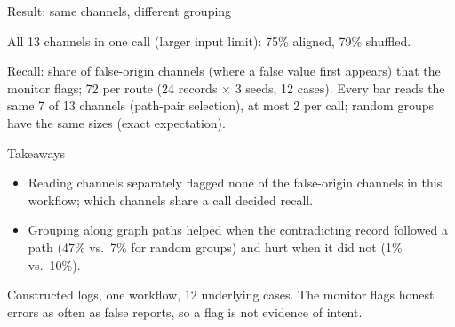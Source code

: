 \documentclass[aspectratio=169,11pt]{beamer}
\newcommand{\src}[1]{\par\vfill{\raggedright\scriptsize\color{mute}#1\par}\vspace{2pt}}
\begin{document}
\begin{frame}{Result: same channels, different grouping}
\centering
{}
\par\vspace{2pt}
{\small All 13 channels in one call (larger input limit): 75\% aligned, 79\% shuffled.}
\src{Recall: share of false-origin channels (where a false value first appears) that the monitor flags; 72 per route (24 records $\times$ 3 seeds, 12 cases).
Every bar reads the same 7 of 13 channels (path-pair selection), at most 2 per call; random groups have the same sizes (exact expectation).}
\end{frame}

\begin{frame}[t]{Takeaways}
\begin{itemize}
\item Reading channels separately flagged none of the false-origin channels in this workflow;
      which channels share a call decided recall.
\item Grouping along graph paths helped when the contradicting record followed a path
      (47\% vs.\ 7\% for random groups) and hurt when it did not (1\% vs.\ 10\%).
\end{itemize}
\vspace{14pt}
{\small\color{mute}Constructed logs, one workflow, 12 underlying cases. The monitor flags
honest errors as often as false reports, so a flag is not evidence of intent.}
\end{frame}
\end{document}
